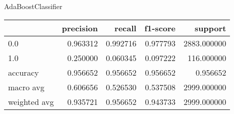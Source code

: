 AdaBoostClassifier
\begin{tabular}{lrrrr}
\toprule
{} &  precision &    recall &  f1-score &      support \\
\midrule
0.0          &   0.963312 &  0.992716 &  0.977793 &  2883.000000 \\
1.0          &   0.250000 &  0.060345 &  0.097222 &   116.000000 \\
accuracy     &   0.956652 &  0.956652 &  0.956652 &     0.956652 \\
macro avg    &   0.606656 &  0.526530 &  0.537508 &  2999.000000 \\
weighted avg &   0.935721 &  0.956652 &  0.943733 &  2999.000000 \\
\bottomrule
\end{tabular}

